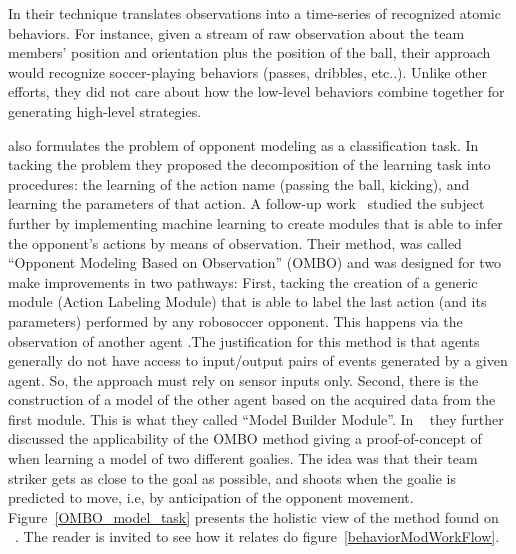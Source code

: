 In \cite{kaminka_learning_2003} their technique translates observations into a time-series of recognized atomic behaviors. For instance, given a stream of raw observation about the team members' position and orientation plus the position of the ball, their approach would recognize soccer-playing behaviors (passes, dribbles, etc..). Unlike other efforts, they did not care about how the low-level behaviors combine together for generating high-level strategies.  

\cite{ledezma_predicting_2002} also formulates the problem of opponent modeling as a classification task. In tacking the problem they proposed the decomposition of the learning task into procedures: the learning of the action name (passing the ball, kicking), and learning the parameters of that action. A follow-up work~\cite{ledezma_predicting_2005} studied the subject further by implementing machine learning to create modules that is able to infer the opponent's actions by means of observation. Their method, was called ``Opponent Modeling Based on Observation'' (OMBO) and was designed for two make improvements in two pathways: First, tacking the creation of a generic module (Action Labeling Module) that is able to label the last action (and its parameters) performed by any robosoccer opponent. This happens via the observation of another agent .The justification for this method is that agents generally do not have access to input/output pairs of events generated by a given agent. So, the approach must rely on sensor inputs only. Second, there is the construction of a model of the other agent based on the acquired data from the first module. This is what they called ``Model Builder Module''. In ~\cite{ledezma_ombo:_2009} they further discussed the applicability of the OMBO method giving a proof-of-concept of when learning a model of two different goalies. The idea was that their team striker gets as close to the goal as possible, and shoots when the goalie is predicted to move, i.e, by anticipation of the opponent movement. Figure~\ref{OMBO_model_task} presents the holistic view of the method found on ~\cite{ledezma_predicting_2005,ledezma_ombo:_2009}. The reader is invited to see how it relates do figure~\ref{behaviorModWorkFlow}.


